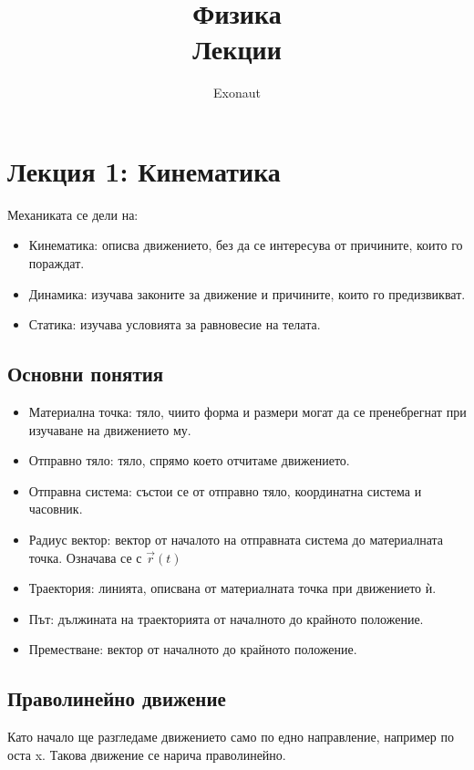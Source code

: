\documentclass[fleqn, 12pt]{article}
\title{Физика \\ Лекции}
\author{Exonaut}
\theoremstyle{definition}
\begin{document}
\maketitle
{}
\newpage
{}

\tableofcontents
\newpage

\section{Лекция 1: Кинематика}
Механиката се дели на: 
\begin{itemize}
	\item Кинематика: описва движението, без да се интересува от причините, които го пораждат.
	\item Динамика: изучава законите за движение и причините, които го предизвикват.
	\item Статика: изучава условията за равновесие на телата.
\end{itemize}

\subsection{Основни понятия}

\begin{itemize}
	\item Материална точка: тяло, чиито форма и размери могат да се пренебрегнат при изучаване на движението му.
	\item Отправно тяло: тяло, спрямо което отчитаме движението.
	\item Отправна система: състои се от отправно тяло, координатна система и часовник.
	\item Радиус вектор: вектор от началото на отправната система до материалната точка. Означава се с $\vec{r}(t)$
	\item Траектория: линията, описвана от материалната точка при движението ѝ.
	\item Път: дължината на траекторията от началното до крайното положение.
	\item Преместване: вектор от началното до крайното положение.
\end{itemize}

\subsection{Праволинейно движение}
Като начало ще разгледаме движението само по едно направление, например по оста x. Такова движение се нарича праволинейно.
\end{document}
